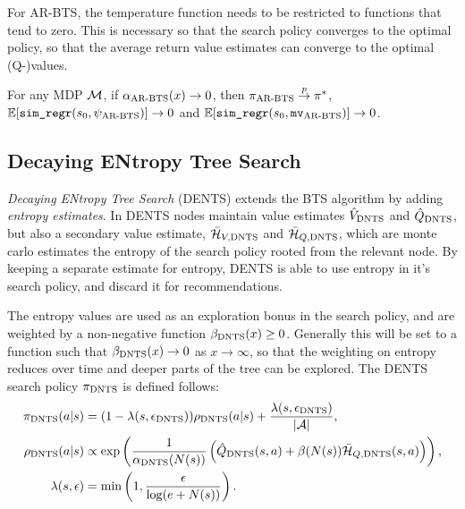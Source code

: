         For AR-BTS, the temperature function needs to be restricted to functions that tend to zero. This is necessary so that the search policy converges to the optimal policy, so that the average return value estimates can converge to the optimal (Q-)values.
        \begin{theorem} \label{thrm:4:ar_bts}
            For any MDP $\mathcal{M}$, if ${\alpha_{{\textnormal{AR-BTS}}}}(x)\rightarrow 0$, then ${\pi_{{\textnormal{AR-BTS}}}}\overset{p}{\to} \pi^*$, $\mathbb{E}[{\textnormal{\texttt{sim\_regr}}}(s_0,{\psi_{{\textnormal{AR-BTS}}}})]\rightarrow 0$ and  $\mathbb{E}[{\textnormal{\texttt{sim\_regr}}}(s_0,{\textup{\texttt{mv}}_{{\textnormal{AR-BTS}}}})]\rightarrow 0$. 
        \end{theorem} 











    
    \subsection{Decaying ENtropy Tree Search}
    \label{sec:4-2-2-dents}


        \textit{Decaying ENtropy Tree Search} (DENTS) extends the BTS algorithm by adding \textit{entropy estimates}. In DENTS nodes maintain value estimates ${\hat{V}_{{\textnormal{DNTS}}}}$ and ${\hat{Q}_{{\textnormal{DNTS}}}}$, but also a secondary value estimate, ${\bar{\mathcal{H}}_{V,{\textnormal{DNTS}}}}$ and ${\bar{\mathcal{H}}_{Q,{\textnormal{DNTS}}}}$, which are monte carlo estimates the entropy of the search policy rooted from the relevant node. By keeping a separate estimate for entropy, DENTS is able to use entropy in it's search policy, and discard it for recommendations.

        The entropy values are used as an exploration bonus in the search policy, and are weighted by a non-negative function ${\beta_{{\textnormal{DNTS}}}}(x)\geq 0$. Generally this will be set to a function such that ${\beta_{{\textnormal{DNTS}}}}(x)\rightarrow 0$ as $x\rightarrow\infty$, so that the weighting on entropy reduces over time and deeper parts of the tree can be explored. The DENTS search policy ${\pi_{{\textnormal{DNTS}}}}$ is defined follows: 
        \begin{align}
            {\pi_{{\textnormal{DNTS}}}}(a|s) &= (1-{\lambda(s,{\epsilon_{{\textnormal{DNTS}}}})}){\rho_{{\textnormal{DNTS}}}}(a|s) + \frac{{\lambda(s,{\epsilon_{{\textnormal{DNTS}}}})}}{|\mathcal{A}|}, 
                        \label{eq:dents_search_policy} \\ 
            {\rho_{{\textnormal{DNTS}}}}(a|s) &\propto \exp\left(\frac{1}{{\alpha_{{\textnormal{DNTS}}}}(N(s))}\left({\hat{Q}_{{\textnormal{DNTS}}}}(s,a)+\beta(N(s)){\bar{\mathcal{H}}_{Q,{\textnormal{DNTS}}}}(s,a)\right)\right),
                        \label{eq:dents_value_policy} \\
            \lambda(s,\epsilon) &= \min\left(1, \frac{\epsilon}{\log(e+N(s))}\right).
        \end{align}

